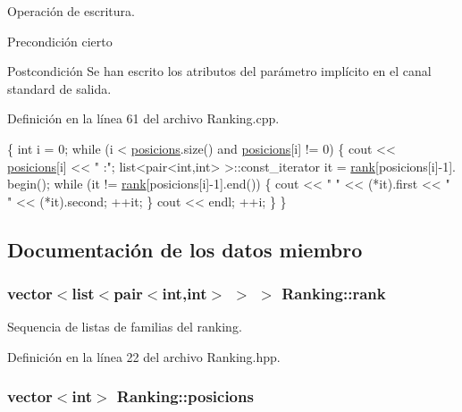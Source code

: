 Operación de escritura. 

\begin{DoxyPrecond}{Precondición}
cierto 
\end{DoxyPrecond}
\begin{DoxyPostcond}{Postcondición}
Se han escrito los atributos del parámetro implícito en el canal standard de salida. 
\end{DoxyPostcond}


Definición en la línea 61 del archivo Ranking.\-cpp.


\begin{DoxyCode}
\{
    \textcolor{keywordtype}{int} i = 0;
    \textcolor{keywordflow}{while} (i < \hyperlink{class_ranking_aaa3215582de4fcca82b9d8637584c12b}{posicions}.size() and \hyperlink{class_ranking_aaa3215582de4fcca82b9d8637584c12b}{posicions}[i] != 0) \{
        cout << \hyperlink{class_ranking_aaa3215582de4fcca82b9d8637584c12b}{posicions}[i] << \textcolor{stringliteral}{" :"};
        list<pair<int,int> >::const\_iterator it = \hyperlink{class_ranking_a1621d0167b2811762a9cb5bc7a520e66}{rank}[posicions[i]-1].
      begin();
        \textcolor{keywordflow}{while} (it != \hyperlink{class_ranking_a1621d0167b2811762a9cb5bc7a520e66}{rank}[posicions[i]-1].end()) \{
            cout << \textcolor{stringliteral}{" "} << (*it).first << \textcolor{stringliteral}{" "} << (*it).second;
            ++it;
        \}
        cout << endl;
        ++i;
    \}
\}
\end{DoxyCode}


\subsection{Documentación de los datos miembro}
\hypertarget{class_ranking_a1621d0167b2811762a9cb5bc7a520e66}{
\subsubsection[{rank}]{\setlength{\rightskip}{0pt plus 5cm}vector$<$list$<$pair$<$int,int$>$ $>$ $>$ Ranking\-::rank\hspace{0.3cm}{\ttfamily [private]}}}\label{class_ranking_a1621d0167b2811762a9cb5bc7a520e66}


Sequencia de listas de familias del ranking. 



Definición en la línea 22 del archivo Ranking.\-hpp.

\hypertarget{class_ranking_aaa3215582de4fcca82b9d8637584c12b}{
\subsubsection[{posicions}]{\setlength{\rightskip}{0pt plus 5cm}vector$<$int$>$ Ranking\-::posicions\hspace{0.3cm}{\ttfamily [private]}}}\label{class_ranking_aaa3215582de4fcca82b9d8637584c12b}


